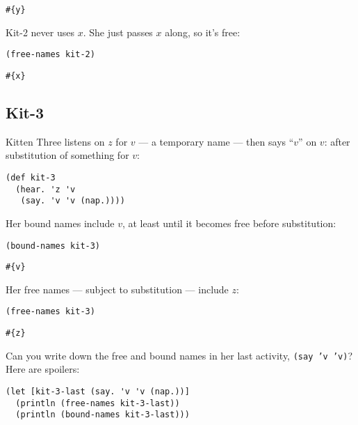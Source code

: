 \documentclass[10pt,oneside,x11names]{article}
\theoremstyle{definition}
\theoremstyle{warning}
\begin{document}
\begin{verbatim}
#{y}
\end{verbatim}


Kit-2 never uses \(x\). She just passes \(x\) along, so it's free:

\vskip 0.26cm
\begin{verbatim}
(free-names kit-2)
\end{verbatim}

\begin{verbatim}
#{x}
\end{verbatim}

\subsection{Kit-3}
\label{sec:org19870a3}

Kitten Three listens on \(z\) for \(v\) --- a temporary name --- then
says ``\(v\)'' on \(v\): after substitution of something for \(v\):

\vskip 0.26cm
\begin{verbatim}
(def kit-3
  (hear. 'z 'v
   (say. 'v 'v (nap.))))
\end{verbatim}

Her bound names include \(v\), at least until it becomes free
before substitution:

\vskip 0.26cm
\begin{verbatim}
(bound-names kit-3)
\end{verbatim}

\begin{verbatim}
#{v}
\end{verbatim}


Her free names --- subject to substitution --- include \(z\):

\vskip 0.26cm
\begin{verbatim}
(free-names kit-3)
\end{verbatim}

\begin{verbatim}
#{z}
\end{verbatim}


Can you write down the free and bound names in her last activity,
\texttt{(say 'v 'v)}? Here are spoilers:

\vskip 0.26cm
\begin{verbatim}
(let [kit-3-last (say. 'v 'v (nap.))]
  (println (free-names kit-3-last))
  (println (bound-names kit-3-last)))
\end{verbatim}
\end{document}
